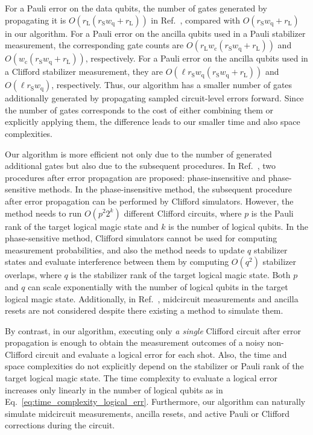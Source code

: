 \documentclass[
 reprint,
 amsmath,amssymb,
 pra,superscriptaddress, nofootinbib
]{revtex4-2}
\theoremstyle{definition}
\theoremstyle{plain}
\begin{document}
For a Pauli error on the data qubits, the number of gates generated by propagating it is $O(r_\mathrm{L}(r_\mathrm{S}w_\mathrm{q}+r_\mathrm{L}))$ in Ref.~\cite{fby6-xjbm}, compared with $O(r_\mathrm{S}w_\mathrm{q}+r_\mathrm{L})$ in our algorithm. 
For a Pauli error on the ancilla qubits used in a Pauli stabilizer measurement, the corresponding gate counts are $O(r_\mathrm{L}w_\mathrm{c}(r_\mathrm{S}w_\mathrm{q}+r_\mathrm{L}))$ and $O(w_\mathrm{c}(r_\mathrm{S}w_\mathrm{q}+r_\mathrm{L}))$, respectively.
For a Pauli error on the ancilla qubits used in a Clifford stabilizer measurement, they are $O(\ell r_\mathrm{S}w_\mathrm{q}(r_\mathrm{S}w_\mathrm{q}+r_\mathrm{L}))$ and $O(\ell r_\mathrm{S}w_\mathrm{q})$, respectively. 
Thus, our algorithm has a smaller number of gates additionally generated by propagating sampled circuit-level errors forward. Since the number of gates corresponds to the cost of either combining them or explicitly applying them, the difference leads to our smaller time and also space complexities.

Our algorithm is more efficient not only due to the number of generated additional gates but also due to the subsequent procedures.
In Ref.~\cite{fby6-xjbm}, two procedures after error propagation are proposed: phase-insensitive and phase-sensitive methods. 
In the phase-insensitive method, the subsequent procedure after error propagation can be performed by Clifford simulators. However, the method needs to run $O(p^2 2^k)$ different Clifford circuits, where $p$ is the Pauli rank of the target logical magic state and $k$ is the number of logical qubits. 
In the phase-sensitive method, Clifford simulators cannot be used for computing measurement probabilities, and also the method needs to update $q$ stabilizer states and evaluate interference between them by computing $O(q^2)$ stabilizer overlaps, where $q$ is the stabilizer rank of the target logical magic state.
Both $p$ and $q$ can scale exponentially with the number of logical qubits in the target logical magic state.
Additionally, in Ref.~\cite{fby6-xjbm}, midcircuit measurements and ancilla resets are not considered despite there existing a method to simulate them. 

By contrast, in our algorithm, executing only \emph{a single} Clifford circuit after error propagation is enough to obtain the measurement outcomes of a noisy non-Clifford circuit and evaluate a logical error for each shot. Also, the time and space complexities do not explicitly depend on the stabilizer or Pauli rank of the target logical magic state.
The time complexity to evaluate a logical error increases only linearly in the number of logical qubits as in Eq.~\eqref{eq:time_complexity_logical_err}.
Furthermore, our algorithm can naturally simulate midcircuit measurements, ancilla resets, and active Pauli or Clifford corrections during the circuit.
\end{document}
